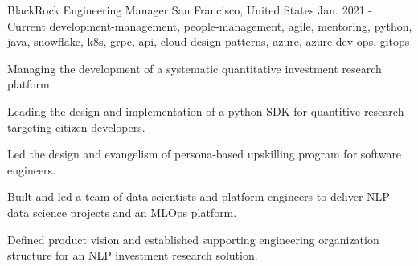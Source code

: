 \cventry
    {BlackRock} %
    {Engineering Manager} %
    {San Francisco, United States} %
    {Jan. 2021 - Current} %
    { development-management, people-management, agile, mentoring, python, java, snowflake, k8s, grpc, api, cloud-design-patterns, azure, azure dev ops, gitops} %
    {
    \begin{cvitems} %
       \item { Managing the development of a systematic quantitative investment research platform. }
       \item { Leading the design and implementation of a python SDK for quantitive research targeting citizen developers. }
       \item { Led the design and evangelism of persona-based upskilling program for software engineers. }
       \item { Built and led a team of data scientists and platform engineers to deliver NLP data science projects and an MLOps platform. }
       \item { Defined product vision and established supporting engineering organization structure for an NLP investment research solution. }
    \end{cvitems}
    }
